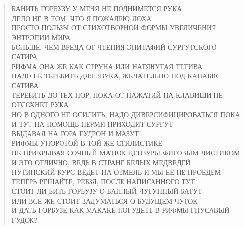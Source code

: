 \poemtitle{***}
\begin{verse}
БАНИТЬ ГОРБУЗУ У МЕНЯ НЕ ПОДНИМЕТСЯ РУКА\\
ДЕЛО НЕ В ТОМ, ЧТО Я ПОЖАЛЕЮ ЛОХА\\
ПРОСТО ПОЛЬЗЫ ОТ СТИХОТВОРНОЙ ФОРМЫ УВЕЛИЧЕНИЯ ЭНТРОПИИ МИРА\\
БОЛЬШЕ, ЧЕМ ВРЕДА ОТ ЧТЕНИЯ ЭПИТАФИЙ СУРГУТСКОГО САТИРА\\
РИФМА ОНА ЖЕ КАК СТРУНА ИЛИ НАТЯНУТАЯ ТЕТИВА\\
НАДО ЕЁ ТЕРЕБИТЬ ДЛЯ ЗВУКА, ЖЕЛАТЕЛЬНО ПОД КАНАБИС САТИВА\\
ТЕРЕБИТЬ ДО ТЕХ ПОР, ПОКА ОТ НАЖАТИЙ НА КЛАВИШИ НЕ ОТСОХНЕТ РУКА\\
НО В ОДНОГО НЕ ОСИЛИТЬ, НАДО ДИВЕРСИФИЦИРОВАТЬСЯ ПОКА\\
И ТУТ НА ПОМОЩЬ ПЕРМИ ПРИХОДИТ СУРГУТ\\
ВЫДАВАЯ НА ГОРА ГУДРОН И МАЗУТ\\
РИФМЫ УПОРОТОЙ В ТОЙ ЖЕ СТИЛИСТИКЕ\\
НЕ ПРИКРЫВАЯ СОЧНЫЙ МАТЮК ЦЕНЗУРЫ ФИГОВЫМ ЛИСТИКОМ\\
И ЭТО ОТЛИЧНО, ВЕДЬ В СТРАНЕ БЕЛЫХ МЕДВЕДЕЙ\\
ПУТИНСКИЙ КУРС ВЕДЁТ НА ОТМЕЛЬ И МЫ ЕЁ НЕ ПРОЕДЕМ\\
ТЕПЕРЬ РЕШАЙТЕ, РЕБЗЯ, ПОСЛЕ НАПИСАННОГО ТУТ\\
СТОИТ ЛИ БИТЬ ГОРБУЗУ О БАННЫЙ ЧУГУННЫЙ БАТУТ\\
ИЛИ ВСЁ ЖЕ СТОИТ ЗАДУМАТЬСЯ О БУДУЩЕМ ЧУТОК\\
И ДАТЬ ГОРБУЗЕ КАК МАКАКЕ ПОГУДЕТЬ В РИФМЫ ГНУСАВЫЙ ГУДОК?
\end{verse}

